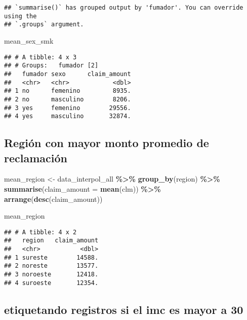 \documentclass[
]{article}
\newenvironment{Shaded}{\begin{snugshade}}{\end{snugshade}}
\newcommand{\AttributeTok}[1]{\textcolor[rgb]{0.13,0.29,0.53}{#1}}
\newcommand{\FunctionTok}[1]{\textcolor[rgb]{0.13,0.29,0.53}{\textbf{#1}}}
\newcommand{\NormalTok}[1]{#1}
\newcommand{\OtherTok}[1]{\textcolor[rgb]{0.56,0.35,0.01}{#1}}
\newcommand{\SpecialCharTok}[1]{\textcolor[rgb]{0.81,0.36,0.00}{\textbf{#1}}}
\begin{document}
\begin{verbatim}
## `summarise()` has grouped output by 'fumador'. You can override using the
## `.groups` argument.
\end{verbatim}

\begin{Shaded}
\begin{Highlighting}[]
\NormalTok{mean\_sex\_smk}
\end{Highlighting}
\end{Shaded}

\begin{verbatim}
## # A tibble: 4 x 3
## # Groups:   fumador [2]
##   fumador sexo      claim_amount
##   <chr>   <chr>            <dbl>
## 1 no      femenino         8935.
## 2 no      masculino        8206.
## 3 yes     femenino        29556.
## 4 yes     masculino       32874.
\end{verbatim}

\subsection{Región con mayor monto promedio de
reclamación}\label{regiuxf3n-con-mayor-monto-promedio-de-reclamaciuxf3n}

\begin{Shaded}
\begin{Highlighting}[]
\NormalTok{mean\_region }\OtherTok{\textless{}{-}}\NormalTok{ data\_interpol\_all }\SpecialCharTok{\%\textgreater{}\%}
        \FunctionTok{group\_by}\NormalTok{(region) }\SpecialCharTok{\%\textgreater{}\%}
        \FunctionTok{summarise}\NormalTok{(}\AttributeTok{claim\_amount =} \FunctionTok{mean}\NormalTok{(clm)) }\SpecialCharTok{\%\textgreater{}\%}
  \FunctionTok{arrange}\NormalTok{(}\FunctionTok{desc}\NormalTok{(claim\_amount))}

\NormalTok{mean\_region}
\end{Highlighting}
\end{Shaded}

\begin{verbatim}
## # A tibble: 4 x 2
##   region   claim_amount
##   <chr>           <dbl>
## 1 sureste        14588.
## 2 noreste        13577.
## 3 noroeste       12418.
## 4 suroeste       12354.
\end{verbatim}

\subsection{etiquetando registros si el imc es mayor a
30}\label{etiquetando-registros-si-el-imc-es-mayor-a-30}
\end{document}
